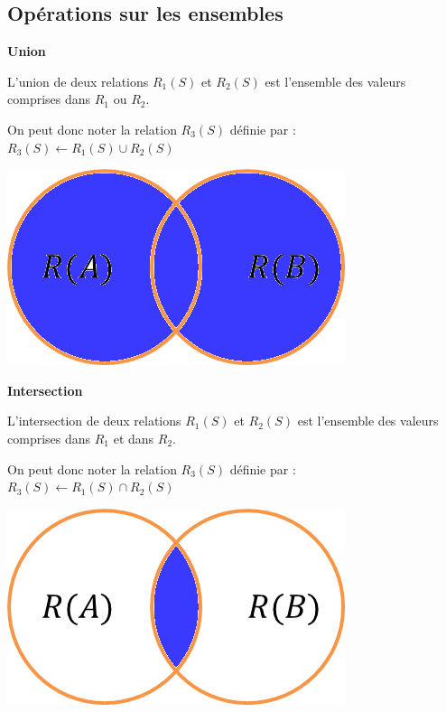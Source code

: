 \documentclass[10pt]{article}
\begin{document}
\subsection{Opérations sur les ensembles}
\begin{defi}
\begin{minipage}[c]{.75\linewidth}
\textbf{Union}

L'union de deux relations $R_1(S)$ et $R_2(S)$ est l'ensemble des valeurs comprises dans $R_1$ ou $R_2$. 

On peut donc noter la relation $R_3(S)$ définie par : $R_3(S)\leftarrow R_1(S)\cup R_2(S)$
\end{minipage}\hfill
\begin{minipage}[c]{.2\linewidth}
\begin{center}
\includegraphics[width=.95\textwidth]{images/union}
\end{center}
\end{minipage}
\end{defi}

\begin{defi}
\begin{minipage}[c]{.75\linewidth}
\textbf{Intersection}

L'intersection de deux relations $R_1(S)$ et $R_2(S)$ est l'ensemble des valeurs comprises dans $R_1$ et dans $R_2$. 

On peut donc noter la relation $R_3(S)$ définie par : $R_3(S)\leftarrow R_1(S)\cap R_2(S)$
\end{minipage}\hfill
\begin{minipage}[c]{.2\linewidth}
\begin{center}
\includegraphics[width=.95\textwidth]{images/inter}
\end{center}
\end{minipage}
\end{defi}
\end{document}
